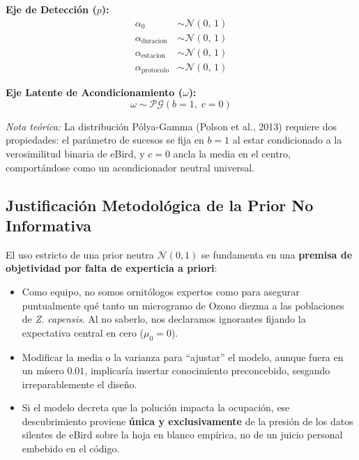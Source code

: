 \documentclass[12pt, a4paper]{article}
\begin{document}
\medskip
\textbf{\textcolor{humanred}{Eje de Detección ($p$):}}
\begin{align}
  \alpha_0 &\sim \mathcal{N}(0,\, 1) \\
  \alpha_{\text{duracion}} &\sim \mathcal{N}(0,\, 1) \\
  \alpha_{\text{estacion}} &\sim \mathcal{N}(0,\, 1) \\
  \alpha_{\text{protocolo}} &\sim \mathcal{N}(0,\, 1)
\end{align}

\medskip
\textbf{\textcolor{ghostgray}{Eje Latente de Acondicionamiento ($\omega$):}}
\begin{equation}
  \omega \sim \mathcal{PG}(b=1,\; c=0)
\end{equation}

\begin{notabox}
\small\textit{Nota teórica:} La distribución Pólya-Gamma (Polson et al., 2013) requiere dos propiedades: el parámetro de sucesos se fija en $b=1$ al estar condicionado a la verosimilitud binaria de eBird, y $c=0$ ancla la media en el centro, comportándose como un acondicionador neutral universal.
\end{notabox}

\subsection{Justificación Metodológica de la Prior No Informativa}

El uso estricto de una prior neutra $\mathcal{N}(0, 1)$ se fundamenta en una \textbf{premisa de objetividad por falta de experticia a priori}:

\begin{itemize}
  \item Como equipo, no somos ornitólogos expertos como para asegurar puntualmente qué tanto un microgramo de Ozono diezma a las poblaciones de \textit{Z. capensis}. Al no saberlo, nos declaramos ignorantes fijando la expectativa central en cero ($\mu_0 = 0$).
  \item Modificar la media o la varianza para ``ajustar'' el modelo, aunque fuera en un mísero $0.01$, implicaría insertar conocimiento preconcebido, sesgando irreparablemente el diseño.
  \item Si el modelo decreta que la polución impacta la ocupación, ese descubrimiento proviene \textbf{única y exclusivamente} de la presión de los datos silentes de eBird sobre la hoja en blanco empírica, no de un juicio personal embebido en el código.
\end{itemize}
\end{document}
